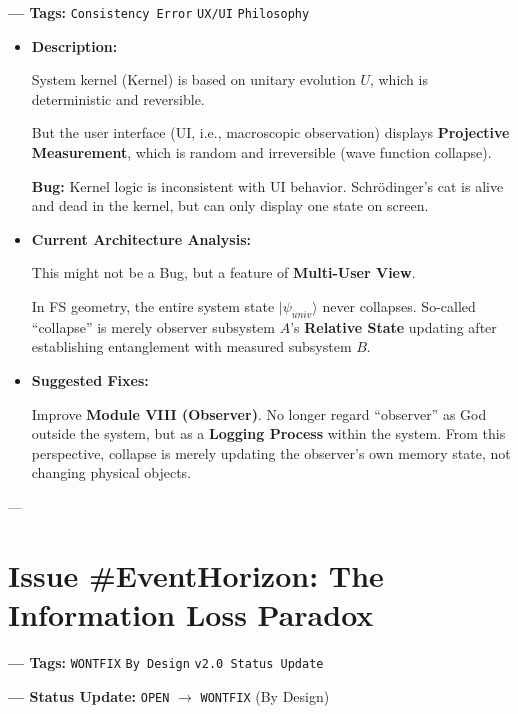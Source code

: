 \documentclass[11pt,a4paper,twoside]{book}
\begin{document}
\textbf{--- Tags:} \texttt{Consistency Error} \texttt{UX/UI} \texttt{Philosophy}

\begin{itemize}
\item \textbf{Description:}

System kernel (Kernel) is based on unitary evolution \textbf{$U$}, which is deterministic and reversible.

But the user interface (UI, i.e., macroscopic observation) displays \textbf{Projective Measurement}, which is random and irreversible (wave function collapse).

\textbf{Bug:} Kernel logic is inconsistent with UI behavior. Schrödinger's cat is alive and dead in the kernel, but can only display one state on screen.

\item \textbf{Current Architecture Analysis:}

This might not be a Bug, but a feature of \textbf{Multi-User View}.

In FS geometry, the entire system state \textbf{$|\psi_{univ}\rangle$} never collapses. So-called ``collapse'' is merely observer subsystem \textbf{$A$}'s \textbf{Relative State} updating after establishing entanglement with measured subsystem \textbf{$B$}.

\item \textbf{Suggested Fixes:}

Improve \textbf{Module VIII (Observer)}. No longer regard ``observer'' as God outside the system, but as a \textbf{Logging Process} within the system. From this perspective, collapse is merely updating the observer's own memory state, not changing physical objects.
\end{itemize}

---

\section{Issue \#EventHorizon: The Information Loss Paradox}

\textbf{--- Tags:} \texttt{WONTFIX} \texttt{By Design} \texttt{v2.0 Status Update}

\textbf{--- Status Update:} \texttt{OPEN} $\to$ \texttt{WONTFIX} (By Design)
\end{document}
